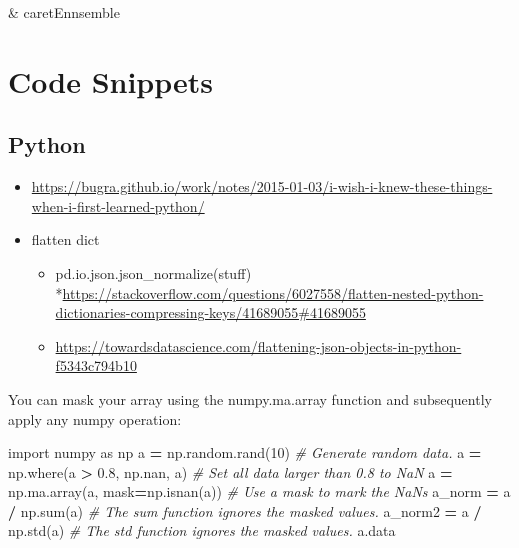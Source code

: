 \documentclass[]{book}
\newenvironment{Shaded}{\begin{snugshade}}{\end{snugshade}}
\newcommand{\DecValTok}[1]{\textcolor[rgb]{0.00,0.00,0.81}{#1}}
\newcommand{\FloatTok}[1]{\textcolor[rgb]{0.00,0.00,0.81}{#1}}
\newcommand{\ImportTok}[1]{#1}
\newcommand{\CommentTok}[1]{\textcolor[rgb]{0.56,0.35,0.01}{\textit{#1}}}
\newcommand{\OperatorTok}[1]{\textcolor[rgb]{0.81,0.36,0.00}{\textbf{#1}}}
\newcommand{\BuiltInTok}[1]{#1}
\newcommand{\NormalTok}[1]{#1}
\providecommand{\tightlist}{%
  \setlength{\itemsep}{0pt}\setlength{\parskip}{0pt}}
\theoremstyle{definition}
\theoremstyle{definition}
\theoremstyle{definition}
\theoremstyle{remark}
\begin{document}
\& caretEnnsemble

\chapter*{Code Snippets}\label{code-snippets}

\section{Python}\label{python}

\begin{itemize}
\item
  \url{https://bugra.github.io/work/notes/2015-01-03/i-wish-i-knew-these-things-when-i-first-learned-python/}
\item
  flatten dict

  \begin{itemize}
  \tightlist
  \item
    pd.io.json.json\_normalize(stuff)
    *\url{https://stackoverflow.com/questions/6027558/flatten-nested-python-dictionaries-compressing-keys/41689055\#41689055}
  \item
    \url{https://towardsdatascience.com/flattening-json-objects-in-python-f5343c794b10}
  \end{itemize}
\end{itemize}

You can mask your array using the numpy.ma.array function and
subsequently apply any numpy operation:

\begin{Shaded}
\begin{Highlighting}[]
\ImportTok{import}\NormalTok{ numpy }\ImportTok{as}\NormalTok{ np}
\NormalTok{a }\OperatorTok{=}\NormalTok{ np.random.rand(}\DecValTok{10}\NormalTok{)            }\CommentTok{# Generate random data.}
\NormalTok{a }\OperatorTok{=}\NormalTok{ np.where(a }\OperatorTok{>} \FloatTok{0.8}\NormalTok{, np.nan, a)  }\CommentTok{# Set all data larger than 0.8 to NaN}
\NormalTok{a }\OperatorTok{=}\NormalTok{ np.ma.array(a, mask}\OperatorTok{=}\NormalTok{np.isnan(a)) }\CommentTok{# Use a mask to mark the NaNs}
\NormalTok{a_norm  }\OperatorTok{=}\NormalTok{ a }\OperatorTok{/}\NormalTok{ np.}\BuiltInTok{sum}\NormalTok{(a) }\CommentTok{# The sum function ignores the masked values.}
\NormalTok{a_norm2 }\OperatorTok{=}\NormalTok{ a }\OperatorTok{/}\NormalTok{ np.std(a) }\CommentTok{# The std function ignores the masked values.}
\NormalTok{a.data}
\end{Highlighting}
\end{Shaded}
\end{document}
